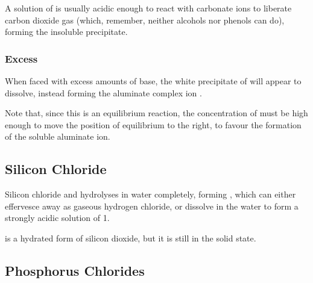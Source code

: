 				A solution of  is usually acidic enough to react with carbonate ions to liberate carbon dioxide
				gas (which, remember, neither alcohols nor phenols can do), forming the insoluble precipitate.



			\subsubsection{Excess }

				When faced with excess amounts of base, the white precipitate of \ch{[\Al(H2O)3(OH)3] \stS} will appear to dissolve, instead
				forming the aluminate complex ion \ch{[\Al(OH)4]- \stAq}.


				Note that, since this is an equilibrium reaction, the concentration of  must be high enough to move the position of
				equilibrium to the right, to favour the formation of the soluble aluminate ion.





		\subsection{Silicon Chloride}

			Silicon chloride  and  hydrolyses in water completely, forming , which can either effervesce
			away as gaseous hydrogen chloride, or dissolve in the water to form a strongly acidic solution of \pH{} \num{1}.


			 is a hydrated form of silicon dioxide, but it is still in the solid state.




		\subsection{Phosphorus Chlorides}

